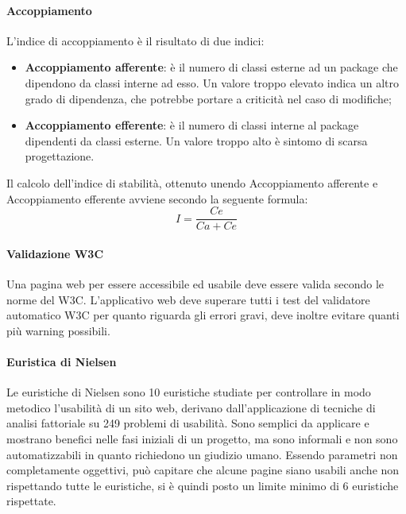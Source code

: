 \documentclass[12pt,a4paper,titlepage]{article}
\begin{document}
			\paragraph{Accoppiamento}
			L'indice di accoppiamento è il risultato di due indici:
			\begin{itemize}
				\item \textbf{Accoppiamento afferente}: è il numero di classi esterne ad un package che dipendono da classi interne ad esso. Un valore troppo elevato indica un altro grado di dipendenza, che potrebbe portare a criticità nel caso di modifiche;
				\item \textbf{Accoppiamento efferente}: è il numero di classi interne al package dipendenti da classi esterne. Un valore troppo alto è sintomo di scarsa progettazione.
			\end{itemize}			
			Il calcolo dell'indice di stabilità, ottenuto unendo Accoppiamento afferente e Accoppiamento efferente avviene secondo la seguente formula:
			\[I=\frac{Ce}{Ca+Ce}\]
			
			\paragraph{Validazione W3C}
			Una pagina web per essere accessibile ed usabile deve essere valida secondo le norme del W3C. L'applicativo web deve superare tutti i test del validatore automatico W3C per quanto riguarda gli errori gravi, deve inoltre evitare quanti più warning possibili.\\
			\paragraph{Euristica di Nielsen}
			Le euristiche di Nielsen sono 10 euristiche studiate per controllare in modo metodico l'usabilità di un sito web, derivano dall'applicazione di tecniche di analisi fattoriale su 249 problemi di usabilità. Sono semplici da applicare e mostrano benefici nelle fasi iniziali di un progetto, ma sono informali e non sono automatizzabili in quanto richiedono un giudizio umano. Essendo parametri non completamente oggettivi, può capitare che alcune pagine siano usabili anche non rispettando tutte le euristiche, si è quindi posto un limite minimo di 6 euristiche rispettate.\\
\end{document}

